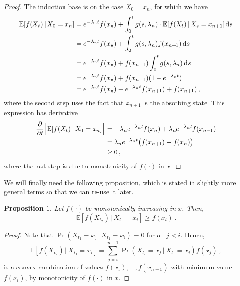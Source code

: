 \documentclass[10pt]{article}
\newtheorem{proposition}[theorem]{Proposition}
\newcommand{\dx}[1][x]{\text{\,d}#1}
\begin{document}
\begin{proof}
The induction base is on the case $X_0=x_n$, for which we have
\begin{align*}
\mathbb{E}[f(X_t)\,\vert\,X_0=x_n] &= e^{-\lambda_n t}f(x_n) + \int_0^t g(s,\lambda_n)\cdot\mathbb{E}[f(X_t)\,\vert\,X_s=x_{n+1}]\dx[s] \\
 &= e^{-\lambda_n t}f(x_n) + \int_0^t g(s,\lambda_n)f(x_{n+1})\dx[s] \\
 &= e^{-\lambda_n t}f(x_n) + f(x_{n+1})\int_0^t g(s,\lambda_n)\dx[s] \\
 &= e^{-\lambda_n t}f(x_n) + f(x_{n+1})(1-e^{-\lambda_n t}) \\
 &= e^{-\lambda_n t}f(x_n) - e^{-\lambda_n t}f(x_{n+1}) + f(x_{n+1})\,,
\end{align*}
where the second step uses the fact that $x_{n+1}$ is the absorbing state. This expression has derivative
\begin{align*}
\frac{\partial}{\partial t}\Bigl[\mathbb{E}[f(X_t)\,\vert\,X_0=x_n]\Bigr] &= -\lambda_n e^{-\lambda_n t}f(x_n) + \lambda_n e^{-\lambda_n t}f(x_{n+1}) \\
 &= \lambda_n e^{-\lambda_n t}\bigl(f(x_{n+1}) - f(x_n)\bigr) \\
 &\geq 0\,,
\end{align*}
where the last step is due to monotonicity of $f(\cdot)$ in $x$.
\end{proof}

We will finally need the following proposition, which is stated in slightly more general terms so that we can re-use it later.
\begin{proposition}
Let $f(\cdot)$ be monotonically increasing in $x$. Then,
\begin{equation*}
\mathbb{E}[f(X_{t_2})\,\vert\,X_{t_1}=x_i] \geq f(x_i)\,.
\end{equation*}
\end{proposition}
\begin{proof}
Note that $\Pr(X_{t_2}=x_j\,\vert\,X_{t_1}=x_i)=0$ for all $j<i$. Hence,
\begin{equation*}
\mathbb{E}[f(X_{t_2})\,\vert\,X_{t_1}=x_i] = \sum_{j=i}^{n+1} \Pr(X_{t_2}=x_j\,\vert\,X_{t_1}=x_i)f(x_j)\,,
\end{equation*}
is a convex combination of values $f(x_i),\ldots,f(x_{n+1})$ with minimum value $f(x_i)$, by monotonicity of $f(\cdot)$ in $x$.
\end{proof}
\end{document}
